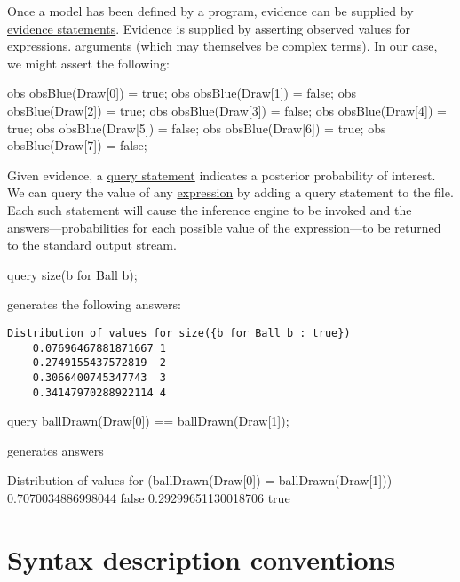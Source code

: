 \documentclass[12pt]{article}
\begin{document}
Once a model has been defined by a \bl program, evidence can be
supplied by \hyperref[evidence-section]{evidence statements}.  
Evidence is supplied by asserting observed values for expressions.
arguments (which may themselves be complex terms). In our case, we might 
assert the following:
\begin{blogcode}
obs obsBlue(Draw[0]) = true;
obs obsBlue(Draw[1]) = false;
obs obsBlue(Draw[2]) = true;
obs obsBlue(Draw[3]) = false;
obs obsBlue(Draw[4]) = true;
obs obsBlue(Draw[5]) = false;
obs obsBlue(Draw[6]) = true;
obs obsBlue(Draw[7]) = false;
\end{blogcode}
Given
evidence, a \hyperref[query-section]{query statement} indicates a
posterior probability of interest. We can query the value of any \hyperref[expression-section]{expression}
by adding a query statement to the file. Each such statement will cause the inference engine to be invoked 
and the answers---probabilities for each possible value of the
expression---to be returned to the standard output stream.
\begin{blogcode}
query size({b for Ball b});
\end{blogcode}
generates the following answers:
\begin{verbatim}
Distribution of values for size({b for Ball b : true})
	0.07696467881871667	1
	0.2749155437572819	2
	0.3066400745347743	3
	0.34147970288922114	4
\end{verbatim}
\begin{blogcode}
query ballDrawn(Draw[0]) == ballDrawn(Draw[1]);
\end{blogcode}
generates answers
\begin{blogcode}
Distribution of values for (ballDrawn(Draw[0]) = ballDrawn(Draw[1]))
	0.7070034886998044	false
	0.29299651130018706	true
\end{blogcode}


\section{Syntax description conventions}\label{convention-section}
\end{document}
